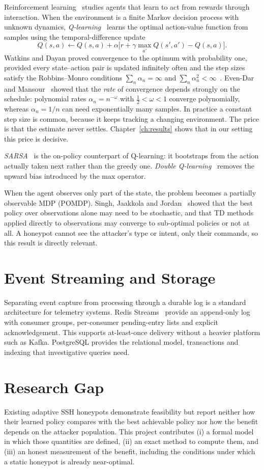 Reinforcement learning~\cite{sutton2018rl} studies agents that learn to act from rewards
through interaction. When the environment is a finite Markov decision process with unknown
dynamics, \emph{Q-learning}~\cite{watkins1992q} learns the optimal action-value function from
samples using the temporal-difference update
\[
Q(s,a) \leftarrow Q(s,a) + \alpha\big[r + \gamma \max_{a'} Q(s',a') - Q(s,a)\big].
\]
Watkins and Dayan proved convergence to the optimum with probability one, provided every
state--action pair is updated infinitely often and the step sizes satisfy the Robbins--Monro
conditions $\sum_n \alpha_n = \infty$ and $\sum_n \alpha_n^2 < \infty$~\cite{robbins1951}.
Even-Dar and Mansour~\cite{evendar2003rates} showed that the \emph{rate} of convergence depends
strongly on the schedule: polynomial rates $\alpha_n = n^{-\omega}$ with $\tfrac12 < \omega < 1$
converge polynomially, whereas $\alpha_n = 1/n$ can need exponentially many samples. In
practice a constant step size is common, because it keeps tracking a changing environment. The
price is that the estimate never settles. Chapter~\ref{ch:results} shows that in our setting
this price is decisive.

\emph{SARSA}~\cite{sutton2018rl} is the on-policy counterpart of Q-learning: it bootstraps from
the action actually taken next rather than the greedy one. \emph{Double
Q-learning}~\cite{vanhasselt2010double} removes the upward bias introduced by the max operator.

When the agent observes only part of the state, the problem becomes a partially observable
MDP (POMDP). Singh, Jaakkola and Jordan~\cite{singh1994pomdp} showed that the best policy over
observations alone may need to be stochastic, and that TD methods applied directly to
observations may converge to sub-optimal policies or not at all. A honeypot cannot see the
attacker's type or intent, only their commands, so this result is directly relevant.

\section{Event Streaming and Storage}

Separating event capture from processing through a durable log is a standard architecture
for telemetry systems. Redis Streams~\cite{redisstreams} provide an append-only log with
consumer groups, per-consumer pending-entry lists and explicit acknowledgement. This supports
at-least-once delivery without a heavier platform such as Kafka. PostgreSQL provides the
relational model, transactions and indexing that investigative queries need.

\section{Research Gap}

Existing adaptive SSH honeypots demonstrate feasibility but report neither how their learned
policy compares with the best achievable policy nor how the benefit depends on the attacker
population. This project contributes (i) a formal model in which those quantities are
defined, (ii) an exact method to compute them, and (iii) an honest measurement of the benefit,
including the conditions under which a static honeypot is already near-optimal.
